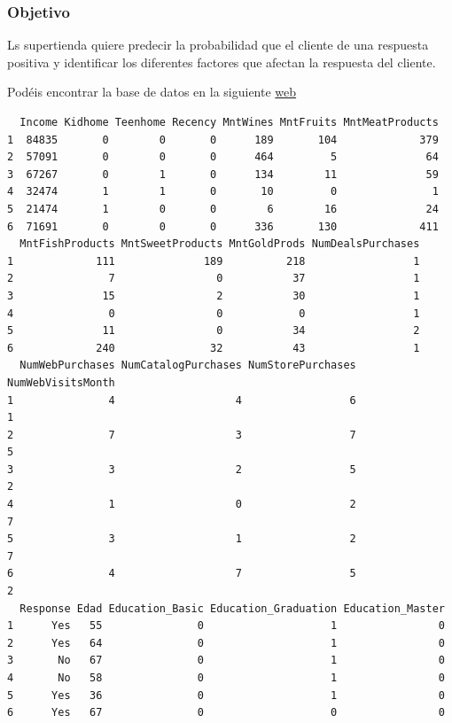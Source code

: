\documentclass[
  letterpaper,
  DIV=11,
  numbers=noendperiod]{scrartcl}
\begin{document}
\subsubsection{Objetivo}\label{objetivo}

Ls supertienda quiere predecir la probabilidad que el cliente de una
respuesta positiva y identificar los diferentes factores que afectan la
respuesta del cliente.

Podéis encontrar la base de datos en la siguiente
\href{https://www.kaggle.com/datasets/ahsan81/superstore-marketing-campaign-dataset}{web}

\begin{verbatim}
  Income Kidhome Teenhome Recency MntWines MntFruits MntMeatProducts
1  84835       0        0       0      189       104             379
2  57091       0        0       0      464         5              64
3  67267       0        1       0      134        11              59
4  32474       1        1       0       10         0               1
5  21474       1        0       0        6        16              24
6  71691       0        0       0      336       130             411
  MntFishProducts MntSweetProducts MntGoldProds NumDealsPurchases
1             111              189          218                 1
2               7                0           37                 1
3              15                2           30                 1
4               0                0            0                 1
5              11                0           34                 2
6             240               32           43                 1
  NumWebPurchases NumCatalogPurchases NumStorePurchases NumWebVisitsMonth
1               4                   4                 6                 1
2               7                   3                 7                 5
3               3                   2                 5                 2
4               1                   0                 2                 7
5               3                   1                 2                 7
6               4                   7                 5                 2
  Response Edad Education_Basic Education_Graduation Education_Master
1      Yes   55               0                    1                0
2      Yes   64               0                    1                0
3       No   67               0                    1                0
4       No   58               0                    1                0
5      Yes   36               0                    1                0
6      Yes   67               0                    0                0

\end{verbatim}
\end{document}
